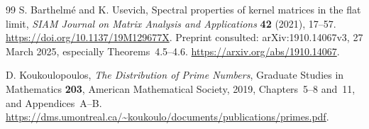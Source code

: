 \documentclass[11pt]{article}
\theoremstyle{definition}\newtheorem{definition}[theorem]{Definition}
\theoremstyle{remark}\newtheorem{remark}[theorem]{Remark}
\begin{document}
\begin{thebibliography}{99}
S. Barthelm\'e and K. Usevich,
Spectral properties of kernel matrices in the flat limit,
\emph{SIAM Journal on Matrix Analysis and Applications}
\textbf{42} (2021), 17--57.
\url{https://doi.org/10.1137/19M129677X}.
Preprint consulted: arXiv:1910.14067v3, 27 March 2025,
especially Theorems~4.5--4.6.
\url{https://arxiv.org/abs/1910.14067}.

D. Koukoulopoulos, \emph{The Distribution of Prime Numbers},
Graduate Studies in Mathematics \textbf{203}, American Mathematical
Society, 2019, Chapters~5--8 and~11, and Appendices~A--B.
\url{https://dms.umontreal.ca/~koukoulo/documents/publications/primes.pdf}.
\end{thebibliography}
\end{document}
